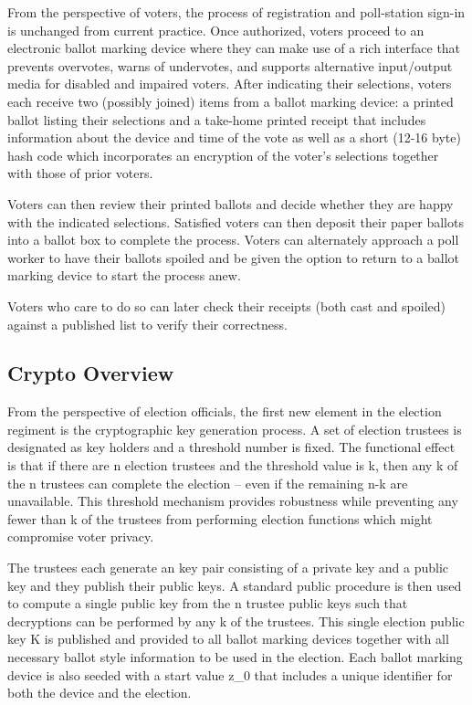 \label{sec:design}

From the perspective of voters, the process of registration and poll-station sign-in is unchanged from current practice.  Once authorized, voters proceed to an electronic ballot marking device where they can make use of a rich interface that prevents overvotes, warns of undervotes, and supports alternative input/output media for disabled and impaired voters.  After indicating their selections, voters each receive two (possibly joined) items from a ballot marking device:  a printed ballot listing their selections and a take-home printed receipt that includes information about the device and time of the vote as well as a short (12-16 byte) hash code which incorporates an encryption of the voter's selections together with those of prior voters.

Voters can then review their printed ballots and decide whether they are happy with the indicated selections.  Satisfied voters can then deposit their paper ballots into a ballot box to complete the process.  Voters can alternately approach a poll worker to have their ballots spoiled and be given the option to return to a ballot marking device to start the process anew.

Voters who care to do so can later check their receipts (both cast and spoiled) against a published list to verify their correctness.

\subsection{Crypto Overview}
From the perspective of election officials, the first new element in the election regiment is the cryptographic key generation process.  A set of election trustees is designated as key holders and a threshold number is fixed.  The functional effect is that if there are n election trustees and the threshold value is k, then any k of the n trustees can complete the election – even if the remaining n-k are unavailable.  This threshold mechanism provides robustness while preventing any fewer than k of the trustees from performing election functions which might compromise voter privacy.

The trustees each generate an \elgamal key pair consisting of a private key and a public key and they publish their public keys.  A standard public procedure is then used to compute a single \elgamal  public key from the n trustee public keys such that decryptions can be performed by any k of the trustees.  This single \elgamal election public key K is published and provided to all ballot marking devices together with all necessary ballot style information to be used in the election.  Each ballot marking device is also seeded with a start value z_0 that includes a unique identifier for both the device and the election.

